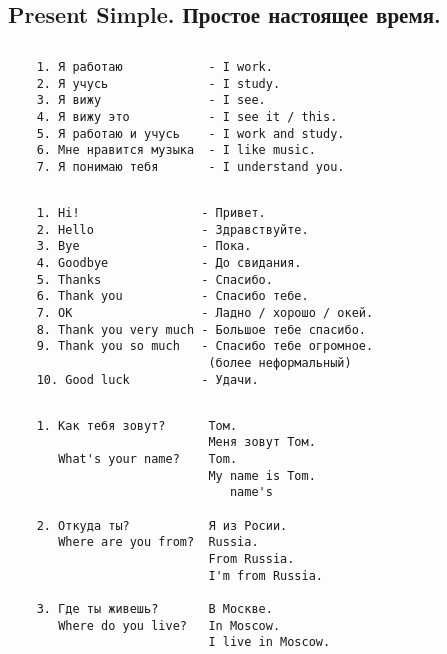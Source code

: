 \subsection{Present Simple. Простое настоящее время.}

\subsection*{}
\begin{verbatim}
    1. Я работаю            - I work.
    2. Я учусь              - I study.
    3. Я вижу               - I see.
    4. Я вижу это           - I see it / this.
    5. Я работаю и учусь    - I work and study.
    6. Мне нравится музыка  - I like music.
    7. Я понимаю тебя       - I understand you.
\end{verbatim}

\subsection*{}
\begin{verbatim}
    1. Hi!                 - Привет.
    2. Hello               - Здравствуйте.
    3. Bye                 - Пока.
    4. Goodbye             - До свидания.
    5. Thanks              - Спасибо.
    6. Thank you           - Спасибо тебе.
    7. OK                  - Ладно / хорошо / окей.
    8. Thank you very much - Большое тебе спасибо.
    9. Thank you so much   - Спасибо тебе огромное.
                            (более неформальный)
    10. Good luck          - Удачи.
\end{verbatim}

\subsection*{}
\begin{verbatim}
    1. Как тебя зовут?      Том.
                            Меня зовут Том.
       What's your name?    Tom.
                            My name is Tom.
                               name's

    2. Откуда ты?           Я из Росии.
       Where are you from?  Russia.
                            From Russia.
                            I'm from Russia.
    
    3. Где ты живешь?       В Москве.
       Where do you live?   In Moscow.
                            I live in Moscow.
\end{verbatim}


